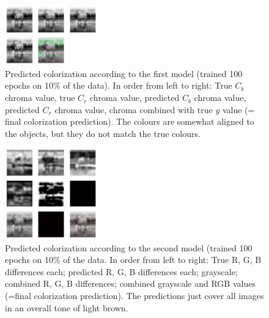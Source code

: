 \documentclass[conference]{IEEEtran}
\begin{document}
\begin{figure}[b]
    \centering
    \includegraphics[width=4cm]{gray_1.png}
    \caption{Predicted colorization according to the first model (trained 100 epochs on 10\% of the data). In order from left to right: True $C_b$ chroma value, true $C_r$ chroma value, predicted $C_b$ chroma value, predicted $C_r$ chroma value, chroma combined with true $y$ value (= final colorization prediction). The colours are somewhat aligned to the objects, but they do not match the true colours.}
    \label{fig:g1}
\end{figure}

\begin{figure}[b]
    \centering
    \includegraphics[width=4cm]{gray_2.png}
    \caption{Predicted colorization according to the second model (trained 100 epochs on 10\% of the data. In order from left to right: True R, G, B differences each; predicted R, G, B differences each; grayscale; combined R, G, B differences; combined grayscale and RGB values (=final colorization prediction). The predictions just cover all images in an overall tone of light brown.}
    \label{fig:g2}
\end{figure}


\newpage
\end{document}
